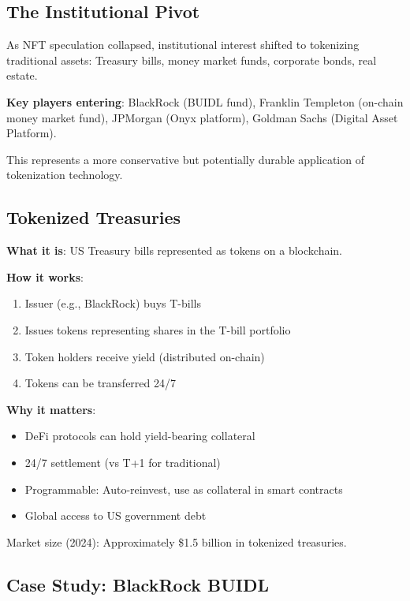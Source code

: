 \documentclass[11pt,a4paper]{article}
\begin{document}
\subsection{The Institutional Pivot}

As NFT speculation collapsed, institutional interest shifted to tokenizing traditional assets: Treasury bills, money market funds, corporate bonds, real estate.

\textbf{Key players entering}: BlackRock (BUIDL fund), Franklin Templeton (on-chain money market fund), JPMorgan (Onyx platform), Goldman Sachs (Digital Asset Platform).

This represents a more conservative but potentially durable application of tokenization technology.

\subsection{Tokenized Treasuries}

\textbf{What it is}: US Treasury bills represented as tokens on a blockchain.

\textbf{How it works}:
\begin{enumerate}
    \item Issuer (e.g., BlackRock) buys T-bills
    \item Issues tokens representing shares in the T-bill portfolio
    \item Token holders receive yield (distributed on-chain)
    \item Tokens can be transferred 24/7
\end{enumerate}

\textbf{Why it matters}:
\begin{itemize}
    \item DeFi protocols can hold yield-bearing collateral
    \item 24/7 settlement (vs T+1 for traditional)
    \item Programmable: Auto-reinvest, use as collateral in smart contracts
    \item Global access to US government debt
\end{itemize}

Market size (2024): Approximately \$1.5 billion in tokenized treasuries.

\subsection{Case Study: BlackRock BUIDL}
\end{document}
